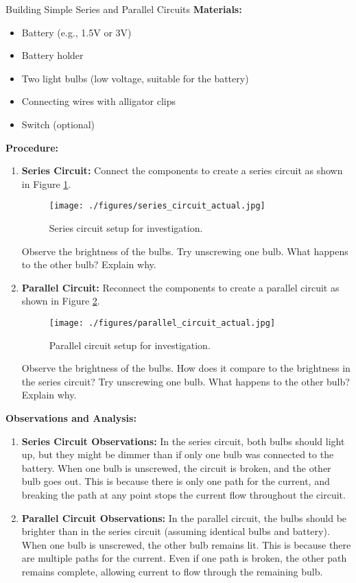 \begin{investigation}{Building Simple Series and Parallel Circuits}
\textbf{Materials:}
\begin{itemize}
    \item Battery (e.g., 1.5V or 3V)
    \item Battery holder
    \item Two light bulbs (low voltage, suitable for the battery)
    \item Connecting wires with alligator clips
    \item Switch (optional)
\end{itemize}

\textbf{Procedure:}
\begin{enumerate}
    \item \textbf{Series Circuit:} Connect the components to create a series circuit as shown in Figure \ref{fig:series_circuit_diagram_actual}.
    \begin{figure}[h]
        \centering
        \texttt{[image: ./figures/series\_circuit\_actual.jpg]}
        \caption{Series circuit setup for investigation.}
        \label{fig:series_circuit_diagram_actual}
    \end{figure}
    Observe the brightness of the bulbs.  Try unscrewing one bulb. What happens to the other bulb? Explain why.
    \item \textbf{Parallel Circuit:} Reconnect the components to create a parallel circuit as shown in Figure \ref{fig:parallel_circuit_diagram_actual}.
    \begin{figure}[h]
        \centering
        \texttt{[image: ./figures/parallel\_circuit\_actual.jpg]}
        \caption{Parallel circuit setup for investigation.}
        \label{fig:parallel_circuit_diagram_actual}
    \end{figure}
    Observe the brightness of the bulbs. How does it compare to the brightness in the series circuit?  Try unscrewing one bulb. What happens to the other bulb? Explain why.
\end{enumerate}

\textbf{Observations and Analysis:}
\begin{enumerate}
    \item \textbf{Series Circuit Observations:} In the series circuit, both bulbs should light up, but they might be dimmer than if only one bulb was connected to the battery. When one bulb is unscrewed, the circuit is broken, and the other bulb goes out. This is because there is only one path for the current, and breaking the path at any point stops the current flow throughout the circuit.
    \item \textbf{Parallel Circuit Observations:} In the parallel circuit, the bulbs should be brighter than in the series circuit (assuming identical bulbs and battery). When one bulb is unscrewed, the other bulb remains lit. This is because there are multiple paths for the current. Even if one path is broken, the other path remains complete, allowing current to flow through the remaining bulb.
\end{enumerate}


\end{investigation}
